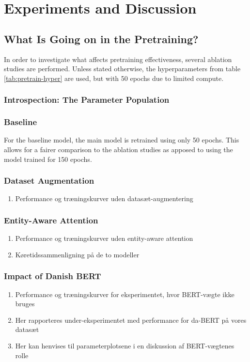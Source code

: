 \documentclass[main.tex]{subfiles}
\begin{document}
\chapter{Experiments and Discussion}

\section{What Is Going on in the Pretraining?}
In order to investigate what affects pretraining effectiveness, several ablation studies are performed.
Unless stated otherwise, the hyperparameters from table \ref{tab:pretrain-hyper} are used, but with 50 epochs due to limited compute.

\subsection{Introspection: The Parameter Population}

\subsection{Baseline}
For the baseline model, the main model is retrained using only 50 epochs.
This allows for a fairer comparison to the ablation studies as apposed to using the model trained for 150 epochs.

\subsection{Dataset Augmentation}
\begin{enumerate}
    \item Performance og træningskurver uden datasæt-augmentering
\end{enumerate}

\subsection{Entity-Aware Attention}
\begin{enumerate}
    \item Performance og træningskurver uden entity-aware attention
    \item Køretidssammenligning på de to modeller
\end{enumerate}

\subsection{Impact of Danish BERT}
\begin{enumerate}
    \item Performance og træningskurver for eksperimentet, hvor BERT-vægte ikke bruges
    \item Her rapporteres under-eksperimentet med performance for da-BERT på vores datasæt
    \item Her kan henvises til parameterplotsene i en diskussion af BERT-vægtenes rolle
\end{enumerate}
\end{document}
